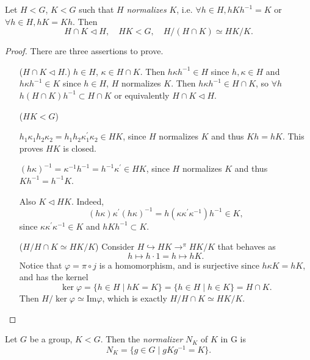 \begin{theorem}
Let $H < G$, $K < G$ such that $H$ \emph{normalizes} $K$, i.e.
$\forall h \in H, h K h^{-1} = K$ or
$\forall h \in H, h K = K h$. Then
$$
H \cap K \triangleleft H,
\quad HK < G,
\quad H / (H \cap K) \simeq HK / K.
$$
\end{theorem}
\begin{proof} There are three assertions to prove.
\begin{itemize}
  \item[($H \cap K \triangleleft H$.)]{
        $h \in H$, $\kappa \in H \cap K$. Then
        $h \kappa h^{-1} \in H$ since $h, \kappa \in H$
        and $h \kappa h^{-1} \in K$ since $h \in H$, $H$ normalizes
        $K$.
        Then $h \kappa h^{-1} \in H \cap K$, so $\forall h$
        $h (H \cap K) h^{-1} \subset H \cap K$ or equivalently
        $H \cap K \triangleleft H$.
       }
  \item[($HK < G$)]{
        $h_1 \kappa_1 h_2 \kappa_2
       = h_1 h_2 \kappa_1^\prime \kappa_2
       \in HK$, since $H$ normalizes $K$ and thus $Kh = hK$.
       This proves $HK$ is closed.

       $(h \kappa)^{-1} = \kappa^{-1} h^{-1} = h^{-1} \kappa^\prime \in HK$, since
       $H$ normalizes $K$ and thus $K h^{-1} = h^{-1} K$.

       Also $K \triangleleft HK$. Indeed,
       $$
       (h \kappa) \kappa^\prime (h \kappa)^{-1}
     = h (\kappa \kappa^\prime \kappa^{-1}) h^{-1} \in K,
       $$
       since $\kappa \kappa^\prime \kappa^{-1} \in K$ and
       $h K h^{-1} \subset K$.
       }
       \item[($H / H \cap K \simeq HK / K$)]{
             Consider $H \hookrightarrow HK \to^{\pi} HK / K$ that behaves as
             $$
             h \mapsto h \cdot 1 = h \mapsto h K.
             $$
             Notice that $\varphi = \pi \circ j$ is a homomorphism, and is
             surjective since $h \kappa K = h K$, and has the kernel
             $$
             \ker \varphi = \{ h \in H \mid hK = K \}
                          = \{ h \in H \mid h \in K \}
                          = H \cap K.
             $$
             Then $H / \ker \varphi \simeq \mathrm{Im} \varphi$, which
             is exactly
             $H / H \cap K \simeq HK / K$.
            }
\end{itemize}
\end{proof}

\begin{defn}[Normalizer]
Let $G$ be a group, $K < G$. Then the \emph{normalizer}
$N_K$ of $K$ in G is
$$
N_K = \{ g \in G \mid g K g^{-1} = K \}.
$$
\end{defn}


